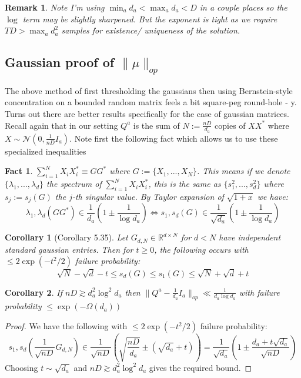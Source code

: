 \documentclass{article}
\newtheorem{corollary}{Corollary}
\newtheorem{fact}[theorem]{Fact}
\newtheorem{remark}{Remark}
\newcommand{\R}{{\mathbb{R}}}
\begin{document}
\begin{remark} Note I'm using $\min_{a} d_{a} < \max_{a} d_{a} < D$ in a couple places so the $\log$ term may be slightly sharpened. But the exponent is tight as we require $TD > \max_{a} d_{a}^{2}$ samples for existence/ uniqueness of the solution.
\end{remark}


\subsection{Gaussian proof of $\|\mu\|_{op}$}
The above method of first thresholding the gaussians then using Bernstein-style concentration on a bounded random matrix feels a bit square-peg round-hole - y. Turns out there are better results specifically for the case of gaussian matrices. Recall again that in our setting $Q^{a}$ is the sum of $N := \frac{nD}{d_{a}}$ copies of $X X^{*}$ where $X \sim \mathcal{N}(0,\frac{1}{nD} I_{a})$. Note first the following fact which allows us to use these specialized inequalities

\begin{fact}
$\sum_{i=1}^{N} X_{i} X_{i}^{*} \equiv G G^{*} $ where $G := \{X_{1}, ..., X_{N}\}$.
This means if we denote $\{\lambda_{1}, ..., \lambda_{d}\}$ the spectrum of $\sum_{i=1}^{N} X_{i} X_{i}^{*}$, this is the same as $\{s_{1}^{2}, ..., s_{d}^{2}\}$ where $s_{j} := s_{j}(G)$ the $j$-th singular value. By Taylor expansion of $\sqrt{1+x}$ we have:
\[ \lambda_{1},\lambda_{d}(GG^{*}) \in \frac{1}{d_{a}} \left( 1 \pm \frac{1}{\log d_{a}} \right) \iff s_{1},s_{d}(G) \in  \frac{1}{\sqrt{d_{a}}} \left( 1 \pm \frac{1}{\log d_{a}} \right)  \]
\end{fact}


\begin{corollary} [Corollary 5.35]%
Let $G_{d,N} \in \R^{d \times N}$ for $d < N$ have independent standard gaussian entries. Then for $t \geq 0$, the following occurs with $\leq 2 \exp(-t^{2}/2)$ failure probability:
\[ \sqrt{N} - \sqrt{d} - t \leq s_{d}(G) \leq s_{1}(G) \leq \sqrt{N} + \sqrt{d} + t  \]
\end{corollary}

\begin{corollary}
If $nD \gtrsim d_{a}^{2} \log^{2} d_{a}$ then $\|Q^{a} - \frac{1}{d_{a}} I_{a} \|_{op} \ll \frac{1}{d_{a} \log d_{a}}$ with failure probability $\leq \exp( - \Omega(d_{a}))$
\end{corollary}
\begin{proof}
We have the following with $\leq 2 \exp(-t^{2}/2)$ failure probability:
\[ s_{1},s_{d}\left( \frac{1}{\sqrt{nD}} G_{d,N} \right) \in \frac{1}{\sqrt{nD}} \left( \sqrt{\frac{nD}{d_{a}}} \pm (\sqrt{d_{a}} + t) \right) = \frac{1}{\sqrt{d_{a}}}\left( 1 \pm \frac{d_{a} + t \sqrt{d_{a}}}{\sqrt{nD}}  \right)  \]
Choosing $t \sim \sqrt{d_{a}}$ and $nD \gtrsim d_{a}^{2} \log^{2} d_{a}$ gives the required bound.
\end{proof}
\end{document}
